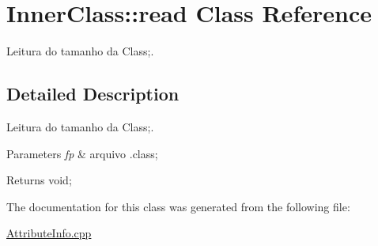 \hypertarget{class_inner_class_1_1read}{}\section{Inner\+Class\+:\+:read Class Reference}
\label{class_inner_class_1_1read}


Leitura do tamanho da Class;.  




\subsection{Detailed Description}
Leitura do tamanho da Class;. 


\begin{DoxyParams}{Parameters}
{\em fp} & arquivo .class; \\
\hline
\end{DoxyParams}
\begin{DoxyReturn}{Returns}
void; 
\end{DoxyReturn}


The documentation for this class was generated from the following file\+:\begin{DoxyCompactItemize}
\item 
\hyperlink{_attribute_info_8cpp}{Attribute\+Info.\+cpp}\end{DoxyCompactItemize}
